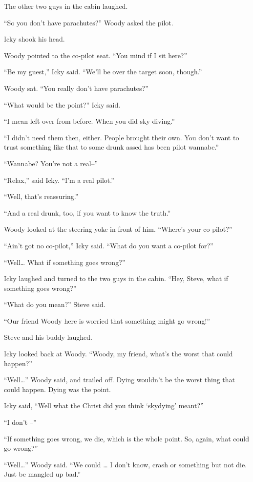 The other two guys in the cabin laughed.

``So you don't have parachutes?'' Woody asked the pilot.

Icky shook his head.

Woody pointed to the co-pilot seat. ``You mind if I sit here?''

``Be my guest,'' Icky said. ``We'll be over the target soon, though.''

Woody sat. ``You really don't have parachutes?''

``What would be the point?'' Icky said.

``I mean left over from before. When you did sky diving.''

``I didn't need them then, either. People brought their own. You don't want to trust something like that to some drunk assed has been pilot wannabe.''

``Wannabe? You're not a real–''

``Relax,'' said Icky. ``I'm a real pilot.''

``Well, that's reassuring.''

``And a real drunk, too, if you want to know the truth.''

Woody looked at the steering yoke in front of him. ``Where's your co-pilot?''

``Ain't got no co-pilot,'' Icky said. ``What do you want a co-pilot for?''

``Well… What if something goes wrong?''

Icky laughed and turned to the two guys in the cabin. ``Hey, Steve, what if something goes wrong?''

``What do you mean?'' Steve said.

``Our friend Woody here is worried that something might go wrong!''

Steve and his buddy laughed.

Icky looked back at Woody. ``Woody, my friend, what's the worst that could happen?''

``Well…'' Woody said, and trailed off. Dying wouldn't be the worst thing that could happen. Dying was the point.

Icky said, ``Well what the Christ did you think `skydying' meant?''

``I don't –''

``If something goes wrong, we die, which is the whole point. So, again, what could go wrong?''

``Well…'' Woody said. ``We could … I don't know, crash or something but not die. Just be mangled up bad.''

